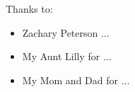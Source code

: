 \noindent
Thanks to:
\begin{itemize}
    \item Zachary Peterson ...
    \item My Aunt Lilly for ... 
    \item My Mom and Dad for ...
\end{itemize}
